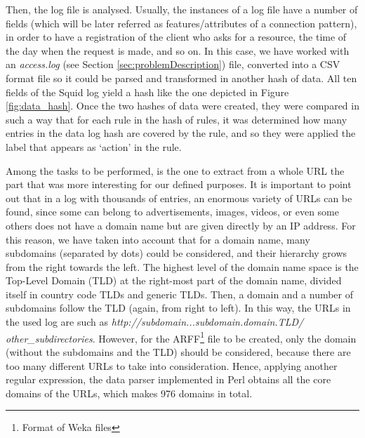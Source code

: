 \documentclass{llncs}
\begin{document}
Then, the log file is analysed. Usually, the instances of a log file have a number of fields (which will be later referred as features/attributes of a connection pattern), in order to have a registration of the client who asks for a resource, the time of the day when the request is made, and so on. In this case, we have worked with an \textit{access.log} (see Section \ref{sec:problemDescription}) file, converted into a CSV format file so it could be parsed and transformed in another hash of data. All ten fields of the Squid log yield a hash like the one depicted in Figure \ref{fig:data_hash}. Once the two hashes of data were created, they were compared in such a way that for each rule in the hash of rules, it was determined how many entries in the data log hash are covered by the rule, and so they were applied the label that appears as `action' in the rule.

Among the tasks to be performed, is the one to extract from a whole URL the part that was more interesting for our defined purposes. It is important to point out that in a log with thousands of entries, an enormous variety of URLs can be found, since some can belong to advertisements, images, videos, or even some others does not have a domain name but are given directly by an IP address. For this reason, we have taken into account that for a domain name, many subdomains (separated by dots) could be considered, and their hierarchy grows from the right towards the left. The highest level of the domain name space is the Top-Level Domain (TLD) at the right-most part of the domain name, divided itself in country code TLDs and generic TLDs. Then, a domain and a number of subdomains follow the TLD (again, from right to left). In this way, the URLs in the
used log are such as \textit{http://subdomain...subdomain.domain.TLD/} \textit{other\_subdirectories}. However, for the ARFF\footnote{Format of Weka files} file to be created, only the domain (without the subdomains and the TLD) should be considered, because there are too many different URLs to take into consideration. Hence, applying another regular expression, the data parser implemented in Perl obtains all the core domains of the URLs, which makes 976 domains in total.
\end{document}
